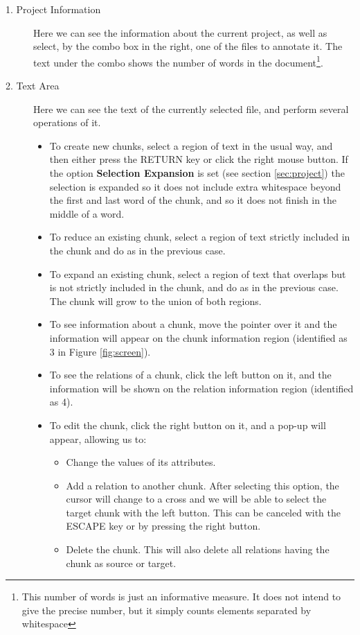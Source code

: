 \documentclass{article}
\begin{document}
\begin{description}
\item[1. Project Information] Here we can see the information about
the current project, as well as select, by the combo box in the right,
one of the files to annotate it. The text under the combo shows the
number of words in the document\footnote{This number of words is just
an informative measure. It does not intend to give the precise number,
but it simply counts elements separated by whitespace}.

\item[2. Text Area] Here we can see the text of the currently selected
file, and perform several operations of it.
\begin{itemize}
\item To create new chunks, select a region of text in the usual way,
and then either press the RETURN key or click the right mouse
button. If the option \textbf{Selection Expansion} is set (see section
\ref{sec:project}) the selection is expanded so it does not include
extra whitespace beyond the first and last word of the chunk, and so
it does not finish in the middle of a word.
\item To reduce an existing chunk, select a region of text strictly
included in the chunk and do as in the previous case.
\item To expand an existing chunk, select a region of text that
overlaps but is not strictly included in the chunk, and do as in the
previous case. The chunk will grow to the union of both regions.
\item To see information about a chunk, move the pointer over it and
the information will appear on the chunk information region
(identified as 3 in Figure \ref{fig:screen}).
\item To see the relations of a chunk, click the left button on it,
and the information will be shown on the relation information region
(identified as 4).
\item To edit the chunk, click the right button on it, and a pop-up
will appear, allowing us to:
  \begin{itemize}
  \item Change the values of its attributes.
  \item Add a relation to another chunk. After selecting this option,
the cursor will change to a cross and we will be able to select the
target chunk with the left button. This can be canceled with the
ESCAPE key or by pressing the right button.
  \item Delete the chunk. This will also delete all relations having
the chunk as source or target.
  \end{itemize}
\end{itemize}


\end{description}
\end{document}
